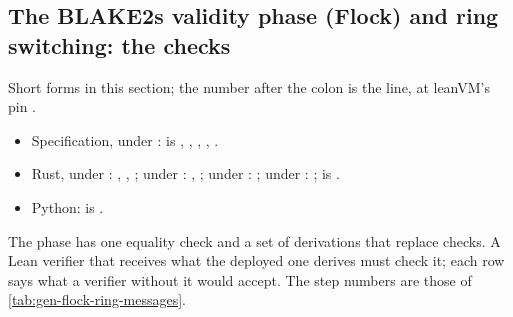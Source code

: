 \subsection{The BLAKE2s validity phase (Flock) and ring switching: the checks}\label{sec:gen-flock-ring-checks}

\begin{sloppypar}
Short forms in this section; the number after the colon is the line, at leanVM's pin
.
\begin{itemize}
\item Specification, under :  is
  ,  , 
  ,  , 
  .
\item Rust, under : , ,
  ; under : ,
  ; under : ;
  under : ;  is
  .
\item Python:  is .
\end{itemize}
\end{sloppypar}

The phase has one equality check and a set of derivations that replace checks. A Lean verifier
that receives what the deployed one derives must check it; each row says what a verifier without
it would accept. The step numbers are those of \cref{tab:gen-flock-ring-messages}.

